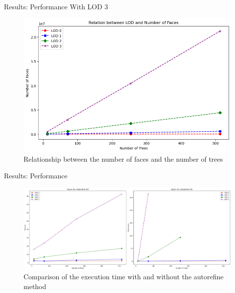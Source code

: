 \documentclass[10pt]{beamer}
\begin{document}
\begin{frame}{Results: Performance}
	\Large
	With LOD 3
	\begin{figure}[H]
		\centering
		\includegraphics[width=\textwidth]{images/perf_lod_faces_lod3.png}
		\caption{Relationship between the number of faces and the number of trees}
	\end{figure}
\end{frame}

\begin{frame}{Results: Performance}
	\Large
	\begin{figure}[H]
		\centering
		\includegraphics[width=1\textwidth]{images/perf_autorefine_ON_OFF.png}
		\caption{Comparison of the execution time with and without the autorefine method}
	\end{figure}
\end{frame}
\end{document}
